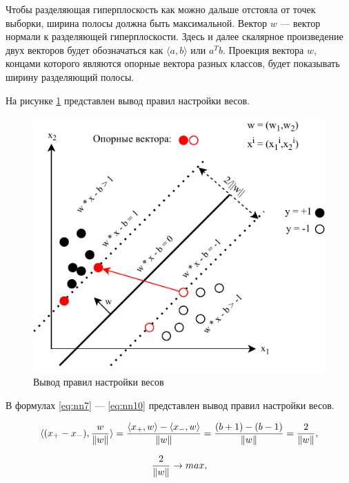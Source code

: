 Чтобы разделяющая гиперплоскость как можно дальше отстояла от точек выборки, ширина полосы должна быть максимальной. Вектор $w$ --- вектор нормали к разделяющей гиперплоскости. Здесь и далее скалярное произведение двух векторов будет обозначаться как $\langle a,b\rangle$ или $a^Tb$. Проекция вектора $w$, концами которого являются опорные вектора разных классов, будет показывать ширину разделяющий полосы.

На рисунке \ref{fig:svm2} представлен вывод правил настройки весов.

\begin{figure}[H]
	\centering
	\includegraphics[width=\textwidth]{img/svm2.pdf}
	\caption{Вывод правил настройки весов}
	\label{fig:svm2}
\end{figure}

В формулах \ref{eq:nn7} --- \ref{eq:nn10} представлен вывод правил настройки весов.

\begin{equation}
	\label{eq:nn7}
	\langle(x_+-x_-),\frac{w}{\Arrowvert w\Arrowvert}\rangle = \frac{\langle x_+,w\rangle - \langle x_-,w\rangle}{\Arrowvert w\Arrowvert} = \frac{(b+1)-(b-1)}{\Arrowvert w\Arrowvert} = \frac{2}{\Arrowvert w\Arrowvert},
\end{equation}

\begin{equation}
	\label{eq:nn8}
	\frac{2}{\Arrowvert w\Arrowvert} \rightarrow max,
\end{equation}

